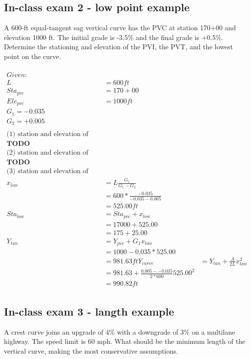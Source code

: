 \documentclass{article}
\begin{document}
  \subsection{In-class exam 2 - low point example}
  A 600-ft equal-tangent sag vertical curve has the PVC at station 170+00 and elevation 1000 ft. The initial grade is -3.5\% and the final grade is +0.5\%. Determine the stationing and elevation of the PVI, the PVT, and the lowest point on the curve.\\
  \\
  \begin{align*}
    Given:\\
    L & = 600 ft \\
    Sta_{pvc} & = 170+00\\
    Ele_{pvc} & = 1000 ft\\
    G_1 = -0.035 \\
    G_2 = +0.005 \\
    \\
    \text{(1) station and elevation of PVI:}\\
    \textbf{TODO} \\
    \text{(2) station and elevation of PVT:}\\
    \textbf{TODO} \\
    \text{(3) station and elevation of the lowest point:}\\
    x_{low} & = L\frac{G_1}{G_1-G_2} \\
            & = 600 * \frac{-0.035}{-0.035 - 0.005} \\
            & = 525.00 ft\\
    Sta_{low} & = Sta_{pvc} + x_{low} \\
              & = 17000 + 525.00 \\
              & = 175+25.00 \\
    Y_{tan} &= Y_{pvc} + G_1x_{low} \\
            &= 1000 - 0.035 * 525.00\\
            &= 981.63 ft 
    Y_{curve} &= Y_{tan} + \frac{A}{2L}x_{low}^2 \\
              &= 981.63 + \frac{0.005 - -0.035}{2*600}525.00^2\\
              &= 990.82 ft \\
  \end{align*}
  
  \newpage
  \subsection{In-class exam 3 - langth example}
  A crest curve joins an upgrade of 4\% with a downgrade of 3\% on a multilane highway.  The speed limit is 60 mph.  What should be the minimum length of the vertical curve, making the most conservative assumptions.\\
  \begin{align*}
  \\    
  \end{align*}
\end{document}

